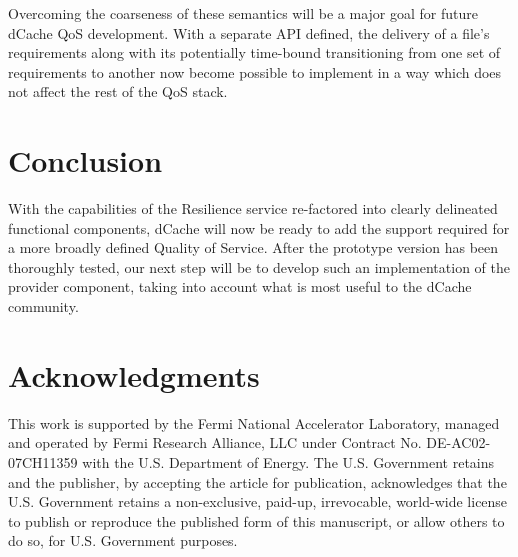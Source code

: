 \documentclass{webofc}
\begin{document}
Overcoming the coarseness of these semantics will be a major goal for future dCache QoS development.  With a separate API defined, the delivery of a file's requirements along with its potentially time-bound transitioning from one set of requirements to another now become possible to implement in a way which does not affect the rest of the QoS stack.  

\section{Conclusion}

With the capabilities of the Resilience service re-factored into clearly delineated functional components, dCache will now be ready to add the support required for a more broadly defined Quality of Service. After the prototype version has been thoroughly tested, our next step will be to develop such an implementation of the provider component, taking into account what is most useful to the dCache community.

\section*{Acknowledgments}

This work is supported by the Fermi National Accelerator Laboratory, managed and operated by Fermi Research Alliance, LLC under Contract No. DE-AC02-07CH11359 with the U.S. Department of Energy. The U.S. Government retains and the publisher, by accepting the article for publication, acknowledges that the U.S. Government retains a non-exclusive, paid-up, irrevocable, world-wide license to publish or reproduce the published form of this manuscript, or allow others to do so, for U.S. Government purposes.


%
% 
%
%
 

%
%

%
%
\end{document}
